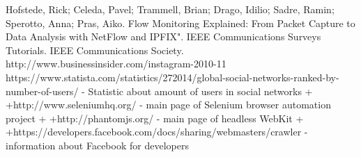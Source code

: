 \begin{thebibliography}{9}

Hofstede, Rick; Celeda, Pavel; Trammell, Brian; Drago, Idilio; Sadre, Ramin; Sperotto, Anna; Pras, Aiko. Flow Monitoring Explained: From Packet Capture to Data Analysis with NetFlow and IPFIX". IEEE Communications Surveys Tutorials. IEEE Communications Society.
http://www.businessinsider.com/instagram-2010-11
https://www.statista.com/statistics/272014/global-social-networks-ranked-by-number-of-users/ - Statistic about amount of users in social networks
+
 +http://www.seleniumhq.org/ - main page of Selenium browser automation project
 +
 +http://phantomjs.org/ - main page of headless WebKit
 +
 +https://developers.facebook.com/docs/sharing/webmasters/crawler - information about Facebook for developers
\end{thebibliography}
